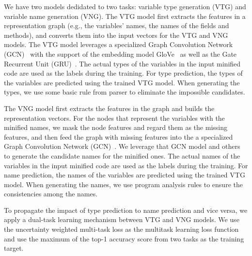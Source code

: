 We have two models dedidated to two tasks: variable type generation
(VTG) and variable name generation (VNG). The VTG model first extracts
the features in a representation graph (e.g., the variables' names,
the names of the fields and methods), and converts them into the input
vectors for the VTG and VNG models. The VTG model leverages a
specialized Graph Convolution Network (GCN)~\cite{} with the support
of the embedding model GloVe~\cite{} as well as the Gate Recurrent
Unit (GRU)~\cite{}. The actual types of the variables in the input
minified code are used as the labels during the training. For type
prediction, the types of the variables are predicted using the trained
VTG model. When generating the types, we use some basic rule from
parser to eliminate the impossible candidates.

The VNG model first extracts the features in the graph and builds the
representation vectors. For the nodes that represent the variables
with the minified names, we mask the node features and regard them as
the missing features, and then feed the graph with missing features
into the a specialized Graph Convolution Network (GCN)~\cite{}. We
leverage that GCN model and others to generate the candidate names for
the minified ones. The actual names of the variables in the input
minified code are used as the labels during the training. For name
prediction, the names of the variables are predicted using the trained
VTG model. When generating the names, we use program analysis rules to
ensure the consistencies among the names.

To propagate the impact of type prediction to name prediction and vice
versa, we apply a dual-task learning mechanism between VTG and VNG
models.  We use the uncertainty weighted multi-task loss as the
multitask learning loss function and use the maximum of the top-1
accuracy score from two tasks as the training target.





